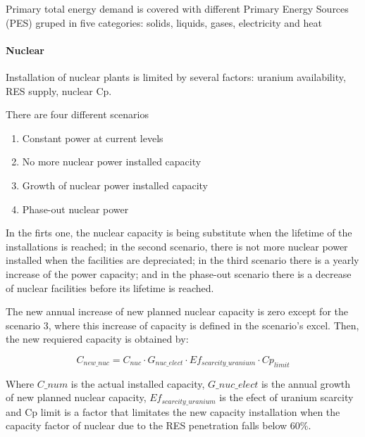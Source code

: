 Primary total energy demand is covered with different Primary Energy Sources (PES) gruped in five categories: solids, liquids, gases, electricity and heat



    

\paragraph{Nuclear}

Installation of nuclear plants is limited by several factors: uranium availability, RES supply, nuclear Cp.

There are four different scenarios
\begin{enumerate}
    \item Constant power at current levels
    \item No more nuclear power installed capacity
    \item Growth of nuclear power installed capacity
    \item Phase-out nuclear power
\end{enumerate}

In the firts one, the nuclear capacity is being substitute when the lifetime of the installations is reached; in the second scenario, there is not more nuclear power installed when the facilities are depreciated; in the third scenario there is a yearly increase of the power capacity; and in the phase-out scenario there is a decrease of nuclear facilities before its lifetime is reached.

The new annual increase of new planned nuclear capacity is zero except for the scenario 3, where this increase of capacity is defined in the scenario's excel. Then, the new requiered capacity is obtained by:

\begin{equation}
C_{new \_nuc}=   C_{nuc} \cdot G_{nuc\_elect} \cdot Ef_{scarcity\_uranium} \cdot Cp_{limit}
\label{eq:new-nuc-capacity}
\end{equation}

Where $C\_num$ is the actual installed capacity, $G\_nuc\_elect$ is the annual growth of new planned nuclear capacity, $Ef_{scarcity\_uranium}$ is the efect of uranium scarcity and Cp limit is a factor that limitates the new capacity installation when the capacity factor of nuclear due to the RES penetration falls below 60\%.

